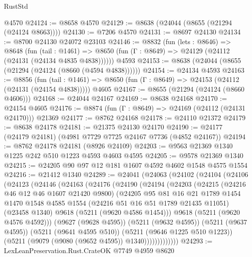 \begin{lexlean}{RustStd}
\begin{coremodule}
    @4570
@24124 := @8658 @4570
@24129 := @8638 (@24044 (@8655 (@21294 (@24124 @8663))))
@24130 := @7206 @4570
@24131 := @8697 @24130
@24134 := @8700 @24130 @24072 @23103
@24146 := @8832
    (fun (lets : @8646) =>
    @8648
      (fun (tail : @1461) =>
      @8650 (fun (Γ : @8649) => @24129 (@24112 (@24131 (@24134 @4835 @4838))))))
    @4593
@24153 := @8638 (@24044 (@8655 (@21294 (@24124 (@8660 (@4594 @4838))))))
@24154 := @24134 @4593
@24163 := @8856
    (fun (tail : @1461) => @8650 (fun (Γ : @8649) => @24153 (@24112 (@24131 (@24154 @4838)))))
    @4605
@24167 := @8655 (@21294 (@24124 (@8660 @4606)))
@24168 := @24044 @24167
@24169 := @8638 @24168
@24170 := @24154 @4605
@24176 := @8874 (fun (Γ : @8649) => @24169 (@24112 (@24131 @24170))) @21369
@24177 := @8762 @24168
@24178 := @24110 @21372
@24179 := @8638 @24178
@24181 := @21375 @24130 @24170
@24190 := @24177 (@24179 @24181) (@4981 @7729 @7725 @24167 @7736 (@4852 @24167))
@24194 := @8762 @24178 @24181 (@8926 @24109)
@24203 := @9563 @21369 @1340 @1225 @242 @510 @1223 @4593 @4603 @4595
@24205 := @9578 @21369 @1340
@24215 := @24205 @90 @97 @12 @181 @1607 @4592 @4602 @1548 @4575 @1554
@24216 := @21412 @1340
@24289 := @24041
    (@24063
      (@24102
        (@24104
          (@24106
            (@24123
              (@24146
                (@24163
                  (@24176
                    (@24190
                      (@24194
                        (@24203
                          (@24215
                            (@24216 @46 @12 @46 @1607 @21420 @9800)
                            (@24205
                              @95
                              @81
                              @16
                              @21
                              @1789
                              @1454
                              @1470
                              @1548
                              @4585
                              @1554
                              (@24216 @51 @16 @51 @1789 @21435 @11051)
                              (@23458 @1340)
                              @9618
                              (@5211 (@9620 @4586 @1454)))
                            @9618
                            (@5211 (@9620 @4576 @4592)))
                          (@9627 (@9628 @4595))
                          (@5211 (@9632 @4595))
                          (@5211 (@9637 @4595))
                          (@5211 (@9641 @4595 @510))
                          (@5211 (@9646 @1225 @510 @1223))
                          (@5211 (@9079 (@9080 (@9652 @4595)) @1340)))))))))))))
@24293 := LexLeanPreservation.Rust.CrateOK @7749 @4959 @8620

\end{coremodule}
\end{lexlean}
